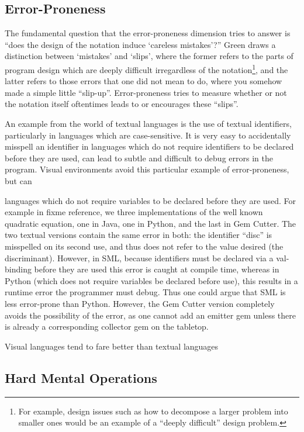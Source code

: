 \subsection{Error-Proneness}
\label{errorpronenessoutline}

The fundamental question that the error-proneness dimension tries to answer is ``does the design of the notation induce `careless mistakes'?''  Green draws a distinction between `mistakes' and `slips', where the former refers to the parts of program design which are deeply difficult irregardless of the notation\footnote{For example, design issues such as how to decompose a larger problem into smaller ones would be an example of a ``deeply difficult'' design problem.}, and the latter refers to those errors that one did not mean to do, where you somehow made a simple little ``slip-up''.  Error-proneness tries to measure whether or not the notation itself oftentimes leads to or encourages these ``slips''.

An example from the world of textual languages is the use of textual identifiers, particularly in languages which are case-sensitive.  It is very easy to accidentally misspell an identifier in languages which do not require identifiers to be declared before they are used, can lead to subtle and difficult to debug errors in the program.  Visual environments avoid this particular example of error-proneness, but can 

languages which do not require variables to be declared before they are used.  For example in fixme reference, we three implementations of the well known quadratic equation, one in Java, one in Python, and the last in Gem Cutter.  The two textual versions contain the same error in both: the identifier ``disc'' is misspelled on its second use, and thus does not refer to the value desired (the discriminant).  However, in SML, because identifiers must be declared via a val-binding before they are used this error is caught at compile time, whereas in Python (which does not require variables be declared before use), this results in a runtime error the programmer must debug.  Thus one could argue that SML is less error-prone than Python.  However, the Gem Cutter version completely avoids the possibility of the error, as one cannot add an emitter gem unless there is already a corresponding collector gem on the tabletop.



Visual languages tend to fare better than textual languages 

\subsection{Hard Mental Operations}
\label{hardmentalopsoutline}

